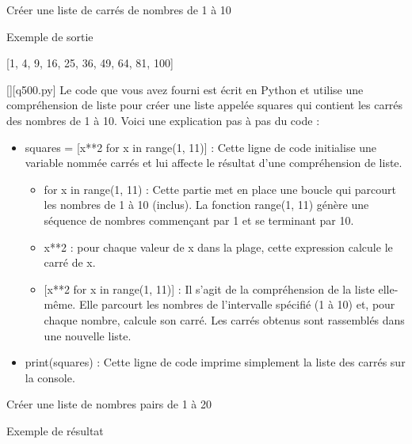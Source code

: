 \renewcommand{\chemincode}{../../code/}
        \question
        Créer une liste de carrés de nombres de 1 à 10

Exemple de sortie

[1, 4, 9, 16, 25, 36, 49, 64, 81, 100]
        \par
        \begin{solution}
            \renewcommand{\nomfichier}{q500.py}
            \pythonfile{\chemincode \nomfichier}[][\nomfichier]
            Le code que vous avez fourni est écrit en Python et utilise une compréhension de liste pour créer une liste appelée squares qui contient les carrés des nombres de 1 à 10. Voici une explication pas à pas du code :\par

\begin{itemize}
\item     squares = [x**2 for x in range(1, 11)] : Cette ligne de code initialise une variable nommée carrés et lui affecte le résultat d'une compréhension de liste.

\begin{itemize}
\item         for x in range(1, 11) : Cette partie met en place une boucle qui parcourt les nombres de 1 à 10 (inclus). La fonction range(1, 11) génère une séquence de nombres commençant par 1 et se terminant par 10.
\item         x**2 : pour chaque valeur de x dans la plage, cette expression calcule le carré de x.
\item{}    [x**2 for x in range(1, 11)]  : Il s'agit de la compréhension de la liste elle-même. Elle parcourt les nombres de l'intervalle spécifié (1 à 10) et, pour chaque nombre, calcule son carré. Les carrés obtenus sont rassemblés dans une nouvelle liste.
\end{itemize}
    \item print(squares) : Cette ligne de code imprime simplement la liste des carrés sur la console.
\end{itemize}
        \end{solution}
        

        \question
        Créer une liste de nombres pairs de 1 à 20

Exemple de résultat

